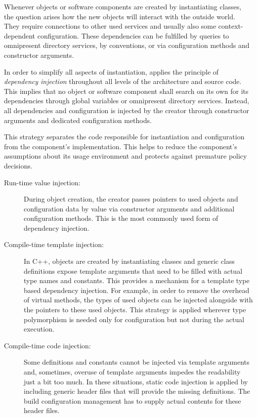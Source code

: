 Whenever objects or software components are created by instantiating classes, the question arises how the new objects will interact with the outside world. They require connections to other used services and usually also some context-dependent configuration. These dependencies can be fulfilled by queries to omnipresent directory services, by conventions, or via configuration methods and constructor arguments. 

In order to simplify all aspects of instantiation, \mythos applies the principle of \emph{dependency injection} throughout all levels of the architecture and source code. This implies that no object or software component shall search on its own for its dependencies through global variables or omnipresent directory services. Instead, all dependencies and configuration is injected by the creator through constructor arguments and dedicated configuration methods.

This strategy separates the code responsible for instantiation and configuration from the
component's implementation. This helps to reduce the component's assumptions about its usage environment and protects against premature policy decisions.

\begin{description}
\item[Run-time value injection:]
During object creation, the creator passes pointers to used objects and configuration data by value via constructor arguments and additional configuration methods. This is the most commonly used form of dependency injection.

\item[Compile-time template injection:]
In C++, objects are created by instantiating classes and generic class definitions expose template arguments that need to be filled with actual type names and constants. This provides a mechanism for a template type based dependency injection. For example, in order to remove the overhead of virtual methods, the types of used objects can be injected alongside with the pointers to these used objects. This strategy is applied wherever type polymorphism is needed only for configuration but not during the actual execution. 

\item[Compile-time code injection:]
Some definitions and constants cannot be injected via template arguments and, sometimes, overuse of template arguments impedes the readability just a bit too much. In these situations, static code injection is applied by including generic header files that will provide the missing definitions. The build configuration management has to supply actual contents for these header files.
\end{description}


